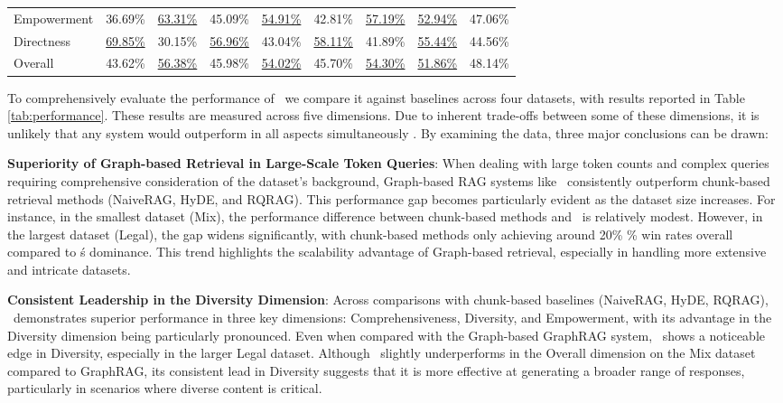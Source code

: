 \begin{table}[h]
{\begin{tabular}{@{}lcccccccc@{}}
Empowerment            & 36.69\%      & \underline{63.31\%}     & 45.09\%      & \underline{54.91\%}     & 42.81\%      & \underline{57.19\%}     & \underline{52.94\%}      & 47.06\%     \\
Directness             & \underline{69.85\%}      & 30.15\%     & \underline{56.96\%}      & 43.04\%     & \underline{58.11\%}      & 41.89\%     & \underline{55.44\%}      & 44.56\%     \\
Overall                & 43.62\%      & \underline{56.38\%}     & 45.98\%      & \underline{54.02\%}     & 45.70\%      & \underline{54.30\%}     & \underline{51.86\%}      & 48.14\%     \\
\bottomrule
\end{tabular}
}
\end{table}

To comprehensively evaluate the performance of \model\, we compare it against baselines across four datasets, with results reported in Table \ref{tab:performance}. These results are measured across five dimensions. Due to inherent trade-offs between some of these dimensions, it is unlikely that any system would outperform in all aspects simultaneously \cite{edge2024local}. By examining the data, three major conclusions can be drawn:

\textbf{Superiority of Graph-based Retrieval in Large-Scale Token Queries}: 
When dealing with large token counts and complex queries requiring comprehensive consideration of the dataset's background, Graph-based RAG systems like \model\ consistently outperform chunk-based retrieval methods (NaiveRAG, HyDE, and RQRAG). This performance gap becomes particularly evident as the dataset size increases. For instance, in the smallest dataset (Mix), the performance difference between chunk-based methods and \model\ is relatively modest. However, in the largest dataset (Legal), the gap widens significantly, with chunk-based methods only achieving around 20\% \% win rates overall compared to \model\'s dominance. This trend highlights the scalability advantage of Graph-based retrieval, especially in handling more extensive and intricate datasets.
    
\textbf{Consistent Leadership in the Diversity Dimension}: 
Across comparisons with chunk-based baselines (NaiveRAG, HyDE, RQRAG), \model\ demonstrates superior performance in three key dimensions: Comprehensiveness, Diversity, and Empowerment, with its advantage in the Diversity dimension being particularly pronounced. Even when compared with the Graph-based GraphRAG system, \model\ shows a noticeable edge in Diversity, especially in the larger Legal dataset. Although \model\ slightly underperforms in the Overall dimension on the Mix dataset compared to GraphRAG, its consistent lead in Diversity suggests that it is more effective at generating a broader range of responses, particularly in scenarios where diverse content is critical.
    
